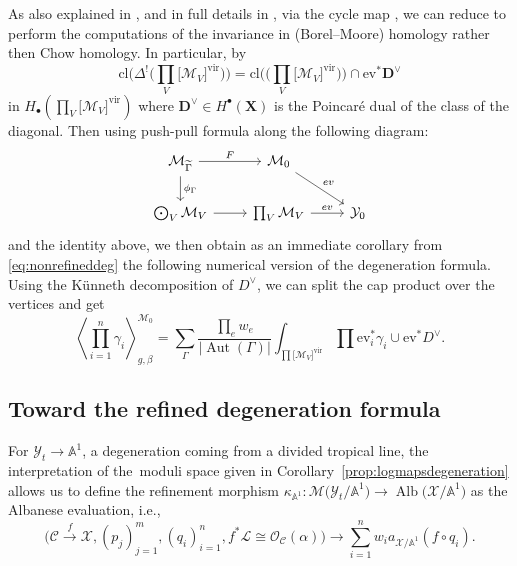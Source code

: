 \documentclass[pdftex]{sigma}
\newcommand{\vir}[1]{\big[#1\big]^\mathrm{vir}}
\newcommand{\ev}{\mathrm{ev}}
\renewcommand{\AA}{\mathbb{A}}
\newcommand{\bfX}{ {\boldsymbol X} }
\newcommand{\bfD}{ {\boldsymbol D} }
\renewcommand{\L}{\mathcal{L}}
\newcommand{\M}{\mathcal{M}}
\newcommand{\X}{\mathcal{X}}
\newcommand{\C}{\mathcal{C}}
\renewcommand{\O}{\mathcal{O}}
\newcommand{\Y}{\mathcal{Y}}
\numberwithin{equation}{section}
\theoremstyle{definition}
\begin{document}
As also explained in \cite{kim2018degeneration}, and in full details in \cite[Chapter~19]{fulton2013intersection}, via the cycle map , we can reduce to perform the computations of the invariance in (Borel--Moore) homology rather then Chow homology. In particular, by \cite[Section~19.1, Theorem~19.2]{fulton2013intersection}
\[\text{cl}\biggl(\Delta^!\biggl(\prod_V\vir{\M_V}\biggr)\biggr)=
\text{cl}\biggl(\biggl(\prod_V\vir{\M_V}\biggr)\biggr)\cap \ev^*\bfD^{\vee}\]
in $H_{\bullet}(\prod_V\vir{\M_V})$
where $\bfD^{\vee}\in H^{\bullet}(\bfX)$ is the Poincar\'e dual of the class of the diagonal.
Then using push-pull formula along the following diagram:
\[
\begin{tikzcd}
\M_{\widetilde{\Gamma}}\ar[r,"F"]\ar[d,"\phi_{\Gamma}"] & \M_0\ar[dr,"ev"]\\
\bigodot_V \M_V\ar[r] & \prod_V\M_V\ar[r,"ev"] & \Y_0
\end{tikzcd}
\]
and the identity above, we then obtain as an immediate corollary from \eqref{eq:nonrefineddeg} the following numerical version of the degeneration formula.
Using the K\"unneth decomposition of $D^\vee$, we can split the cap product over the vertices and get
\begin{equation}
\label{eq-numerical-decomposition-formula}
\left\langle \prod_{i=1}^{n}{\gamma_{i}}\right\rangle_{g,\beta}^{\M_{0}} = \sum_{\Gamma}\frac{\prod_{e}w_e}{|\operatorname{Aut}(\Gamma)|}\int_{\prod\vir{\M_V}} \prod \ev_i^*\gamma_{i}\cup \ev^* D^\vee.
\end{equation}

\subsection{Toward the refined degeneration formula}

For $\Y_t\to \mathbb A^1$, a degeneration coming from a divided tropical line, the interpretation of the~moduli space given in Corollary~\ref{prop:logmapsdegeneration} allows us to define the refinement morphism
$\kappa_{\AA^1} \colon \M\bigl(\Y_t\slash\mathbb A^1\bigr)\to \operatorname{Alb}\bigl(\X\slash\mathbb A^1\bigr)$
as the Albanese evaluation, i.e.,
\[\bigl(\C\xrightarrow{f}\X,(p_j)_{j=1}^m,(q_i)_{i=1}^n,f^*\L\cong\O_{\C}(\alpha)\bigr)\rightarrow \sum_{i=1}^n w_i a_{\X\slash \mathbb A^1}(f\circ q_i).\]
\end{document}
